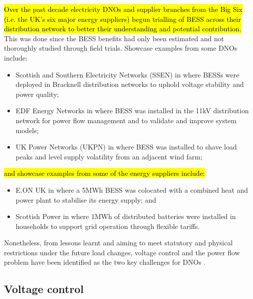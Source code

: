 \hl{Over the past decade electricity DNOs and supplier branches from the Big Six (i.e. the UK's six major energy suppliers) begun trialling of BESS across their distribution network to better their understanding and potential contribution.}
This was done since the BESS benefits had only been estimated and not thoroughly studied through field trials.
Showcase examples from some DNOs include:
\begin{itemize}
	\item Scottish and Southern Electricity Networks (SSEN) in \cite{NTVV2016} where BESSs were deployed in Bracknell distribution networks to uphold voltage stability and power quality;
	\item EDF Energy Networks in \cite{Wade2010} where BESS was installed in the 11kV distribution network for power flow management and to validate and improve system models;
	\item UK Power Networks (UKPN) in \cite{Lyons2015a} where BESS was installed to shave load peaks and level supply volatility from an adjacent wind farm;
\end{itemize}
\hl{and showcase examples from some of the energy suppliers include:}
\begin{itemize}
	\item E.ON UK in \cite{EON2017} where a 5MWh BESS was colocated with a combined heat and power plant to stabilise its energy supply; and
	\item Scottish Power in \cite{ScottishPower2016} where 1MWh of distributed batteries were installed in households to support grid operation through flexible tariffs.
\end{itemize}
Nonetheless, from lessons learnt and aiming to meet statutory and physical restrictions under the future load changes, voltage control and the power flow problem have been identified as the two key challenges for DNOs \cite{Ferreira2013a, Shi2015}.

\subsection{Voltage control}
\label{ch-literature:subsec:voltage-control}

